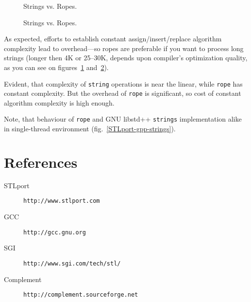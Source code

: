 \documentclass[a4paper]{article}
\providecommand{\libstd}{{\fontfamily{cmtt}\selectfont GNU \mbox{libstd++}}}
\begin{document}


\begin{figure}
  \begin{center}
    
  \end{center}
  \caption{Strings vs. Ropes.\label{STLport-rope-string}}
\end{figure}

\begin{figure}
  \begin{center}
    
  \end{center}
  \caption{Strings vs. Ropes.\label{STLport-rope-string-1}}
\end{figure}

As expected, efforts to establish constant assign/insert/replace
algorithm complexity lead to
overhead---so ropes are preferable if you want to process
long strings (longer then 4K or 25--30K, depends upon compiler's optimization quality, as you can see on figures~\ref{STLport-rope-string} and~\ref{STLport-rope-string-1}).

Evident, that complexity of \texttt{string} operations is near the linear,
while \texttt{rope} has constant complexity. But the overhead
of \texttt{rope} is significant, so cost of constant algorithm complexity
is high enough.

Note, that behaviour of \texttt{rope} and \libstd{} \texttt{strings} implementation
alike in single-thread environment (fig.~\ref{STLport-gpp-strings}).

\section{References}

\noindent
\begin{description}
  \item[STLport] \texttt{http://www.stlport.com}
  \item[GCC]     \texttt{http://gcc.gnu.org}
  \item[SGI]     \texttt{http://www.sgi.com/tech/stl/}
  \item[Complement] \texttt{http://complement.sourceforge.net}
\end{description}
\end{document}
